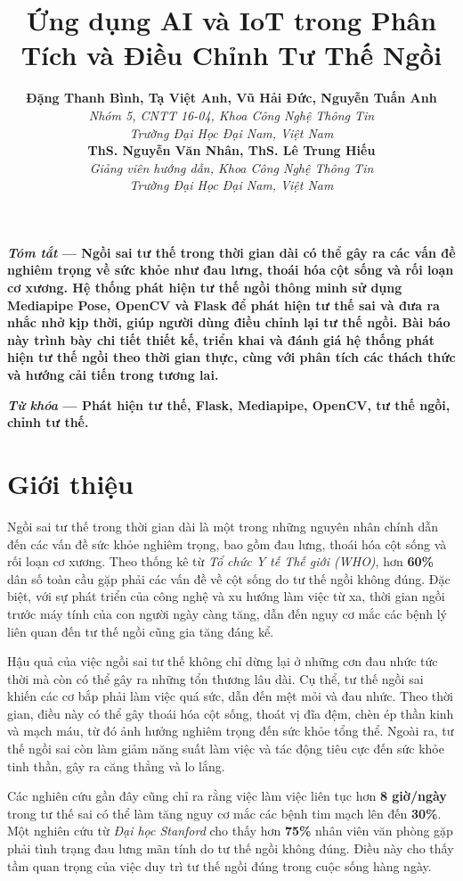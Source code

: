 \documentclass[conference]{IEEEtran}
\title{Ứng dụng AI và IoT trong Phân Tích và Điều Chỉnh Tư Thế Ngồi}
\author{
    \textbf{Đặng Thanh Bình, Tạ Việt Anh, Vũ Hải Đức, Nguyễn Tuấn Anh} \\
    \textit{Nhóm 5, CNTT 16-04, Khoa Công Nghệ Thông Tin} \\
    \textit{Trường Đại Học Đại Nam, Việt Nam} \\
    \textbf{ThS. Nguyễn Văn Nhân, ThS. Lê Trung Hiếu} \\
    \textit{Giảng viên hướng dẫn, Khoa Công Nghệ Thông Tin} \\
    \textit{Trường Đại Học Đại Nam, Việt Nam}
}
\begin{document}
\maketitle
\IEEEpeerreviewmaketitle

\noindent\textbf{\textit{Tóm tắt} --- Ngồi sai tư thế trong thời gian dài có thể gây ra các vấn đề nghiêm trọng về sức khỏe như đau lưng, thoái hóa cột sống và rối loạn cơ xương. Hệ thống phát hiện tư thế ngồi thông minh sử dụng Mediapipe Pose, OpenCV và Flask để phát hiện tư thế sai và đưa ra nhắc nhở kịp thời, giúp người dùng điều chỉnh lại tư thế ngồi. Bài báo này trình bày chi tiết thiết kế, triển khai và đánh giá hệ thống phát hiện tư thế ngồi theo thời gian thực, cùng với phân tích các thách thức và hướng cải tiến trong tương lai.}

\vspace{2mm} %

\noindent\textbf{\textit{Từ khóa} --- Phát hiện tư thế, Flask, Mediapipe, OpenCV, tư thế ngồi, chỉnh tư thế.}

\section{Giới thiệu}
Ngồi sai tư thế trong thời gian dài là một trong những nguyên nhân chính dẫn đến các vấn đề sức khỏe nghiêm trọng, bao gồm đau lưng, thoái hóa cột sống và rối loạn cơ xương. Theo thống kê từ \textit{Tổ chức Y tế Thế giới (WHO)}, hơn \textbf{60\%} dân số toàn cầu gặp phải các vấn đề về cột sống do tư thế ngồi không đúng. Đặc biệt, với sự phát triển của công nghệ và xu hướng làm việc từ xa, thời gian ngồi trước máy tính của con người ngày càng tăng, dẫn đến nguy cơ mắc các bệnh lý liên quan đến tư thế ngồi cũng gia tăng đáng kể.

Hậu quả của việc ngồi sai tư thế không chỉ dừng lại ở những cơn đau nhức tức thời mà còn có thể gây ra những tổn thương lâu dài. Cụ thể, tư thế ngồi sai khiến các cơ bắp phải làm việc quá sức, dẫn đến mệt mỏi và đau nhức. Theo thời gian, điều này có thể gây thoái hóa cột sống, thoát vị đĩa đệm, chèn ép thần kinh và mạch máu, từ đó ảnh hưởng nghiêm trọng đến sức khỏe tổng thể. Ngoài ra, tư thế ngồi sai còn làm giảm năng suất làm việc và tác động tiêu cực đến sức khỏe tinh thần, gây ra căng thẳng và lo lắng.

Các nghiên cứu gần đây cũng chỉ ra rằng việc làm việc liên tục hơn \textbf{8 giờ/ngày} trong tư thế sai có thể làm tăng nguy cơ mắc các bệnh tim mạch lên đến \textbf{30\%}. Một nghiên cứu từ \textit{Đại học Stanford} cho thấy hơn \textbf{75\%} nhân viên văn phòng gặp phải tình trạng đau lưng mãn tính do tư thế ngồi không đúng. Điều này cho thấy tầm quan trọng của việc duy trì tư thế ngồi đúng trong cuộc sống hàng ngày.
\end{document}
